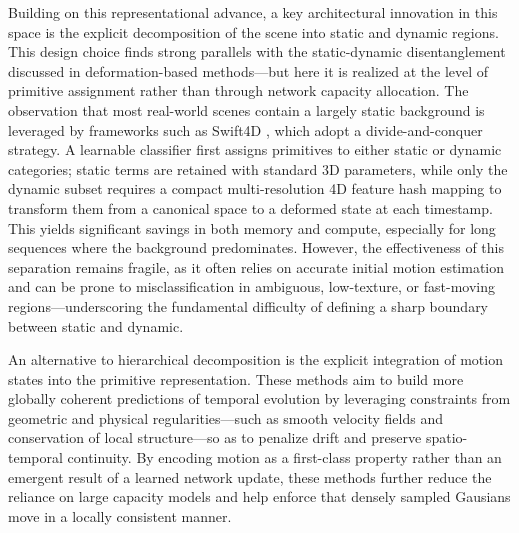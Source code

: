 \documentclass[11pt,a4paper]{article}
\begin{document}
Building on this representational advance, a key architectural innovation in this space is the explicit decomposition of the scene into static and dynamic regions. This design choice finds strong parallels with the static-dynamic disentanglement discussed in deformation-based methods---but here it is realized at the level of primitive assignment rather than through network capacity allocation. The observation that most real-world scenes contain a largely static background is leveraged by frameworks such as Swift4D \cite{arxiv:2503.12307v1}, which adopt a divide-and-conquer strategy. A learnable classifier first assigns primitives to either static or dynamic categories; static terms are retained with standard 3D parameters, while only the dynamic subset requires a compact multi-resolution 4D feature hash mapping to transform them from a canonical space to a deformed state at each timestamp. This yields significant savings in both memory and compute, especially for long sequences where the background predominates. However, the effectiveness of this separation remains fragile, as it often relies on accurate initial motion estimation and can be prone to misclassification in ambiguous, low-texture, or fast-moving regions---underscoring the fundamental difficulty of defining a sharp boundary between static and dynamic.

An alternative to hierarchical decomposition is the explicit integration of motion states into the primitive representation. These methods aim to build more globally coherent predictions of temporal evolution by leveraging constraints from geometric and physical regularities---such as smooth velocity fields and conservation of local structure---so as to penalize drift and preserve spatio-temporal continuity. By encoding motion as a first-class property rather than an emergent result of a learned network update, these methods further reduce the reliance on large capacity models and help enforce that densely sampled Gausians move in a locally consistent manner.
\end{document}

